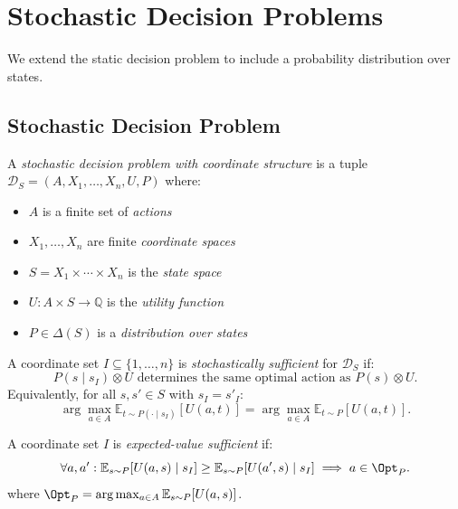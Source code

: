\section{Stochastic Decision Problems}\label{sec:stochastic}

We extend the static decision problem to include a probability distribution over states.

\subsection{Stochastic Decision Problem}

\begin{definition}\label{def:stochastic-decision-problem}
A \emph{stochastic decision problem with coordinate structure} is a tuple $\mathcal{D}_S = (A, X_1, \ldots, X_n, U, P)$ where:
\begin{itemize}
\item $A$ is a finite set of \emph{actions}
\item $X_1, \ldots, X_n$ are finite \emph{coordinate spaces}
\item $S = X_1 \times \cdots \times X_n$ is the \emph{state space}
\item $U : A \times S \to \mathbb{Q}$ is the \emph{utility function}
\item $P \in \Delta(S)$ is a \emph{distribution over states}
\end{itemize}
\end{definition}

\begin{definition}\label{def:stochastic-sufficient}
A coordinate set $I \subseteq \{1, \ldots, n\}$ is \emph{stochastically sufficient} for $\mathcal{D}_S$ if:
\[
P(s \mid s_I) \otimes U \text{ determines the same optimal action as } P(s) \otimes U.
\]
Equivalently, for all $s, s' \in S$ with $s_I = s'_I$:
\[
\arg\max_{a \in A} \mathbb{E}_{t \sim P(\cdot \mid s_I)}[U(a, t)] = \arg\max_{a \in A} \mathbb{E}_{t \sim P}[U(a, t)].
\]
\end{definition}

\begin{definition}\label{def:expected-value-sufficient}
A coordinate set $I$ is \emph{expected-value sufficient} if:
\[
\forall a, a' : \mathbb{E}_{s \sim P}[U(a,s) \mid s_I] \geq \mathbb{E}_{s \sim P}[U(a',s) \mid s_I] \implies a \in \Opt_P.
\]
where $\Opt_P = \arg\max_{a \in A} \mathbb{E}_{s \sim P}[U(a,s)]$.
\end{definition}

